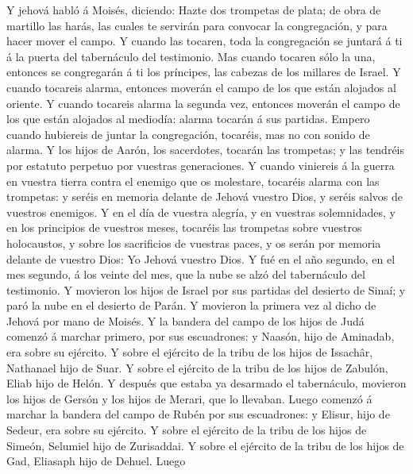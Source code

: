  Y jehová habló á Moisés, diciendo:  Hazte dos
trompetas de plata; de obra de martillo las harás, las cuales te
servirán para convocar la congregación, y para hacer mover el campo.
 Y cuando las tocaren, toda la congregación se juntará á ti
á la puerta del tabernáculo del testimonio.  Mas cuando
tocaren sólo la una, entonces se congregarán á ti los príncipes, las
cabezas de los millares de Israel.  Y cuando tocareis
alarma, entonces moverán el campo de los que están alojados al oriente.
 Y cuando tocareis alarma la segunda vez, entonces moverán
el campo de los que están alojados al mediodía: alarma tocarán á sus
partidas.  Empero cuando hubiereis de juntar la
congregación, tocaréis, mas no con sonido de alarma.  Y los
hijos de Aarón, los sacerdotes, tocarán las trompetas; y las tendréis
por estatuto perpetuo por vuestras generaciones.  Y cuando
viniereis á la guerra en vuestra tierra contra el enemigo que os
molestare, tocaréis alarma con las trompetas: y seréis en memoria
delante de Jehová vuestro Dios, y seréis salvos de vuestros enemigos.
 Y en el día de vuestra alegría, y en vuestras
solemnidades, y en los principios de vuestros meses, tocaréis las
trompetas sobre vuestros holocaustos, y sobre los sacrificios de
vuestras paces, y os serán por memoria delante de vuestro Dios: Yo
Jehová vuestro Dios.  Y fué en el año segundo, en el mes
segundo, á los veinte del mes, que la nube se alzó del tabernáculo del
testimonio.  Y movieron los hijos de Israel por sus
partidas del desierto de Sinaí; y paró la nube en el desierto de Parán.
 Y movieron la primera vez al dicho de Jehová por mano de
Moisés.  Y la bandera del campo de los hijos de Judá
comenzó á marchar primero, por sus escuadrones: y Naasón, hijo de
Aminadab, era sobre su ejército.  Y sobre el ejército de la
tribu de los hijos de Issachâr, Nathanael hijo de Suar.  Y
sobre el ejército de la tribu de los hijos de Zabulón, Eliab hijo de
Helón.  Y después que estaba ya desarmado el tabernáculo,
movieron los hijos de Gersón y los hijos de Merari, que lo llevaban.
 Luego comenzó á marchar la bandera del campo de Rubén por
sus escuadrones: y Elisur, hijo de Sedeur, era sobre su ejército.
 Y sobre el ejército de la tribu de los hijos de Simeón,
Selumiel hijo de Zurisaddai.  Y sobre el ejército de la
tribu de los hijos de Gad, Eliasaph hijo de Dehuel.  Luego
